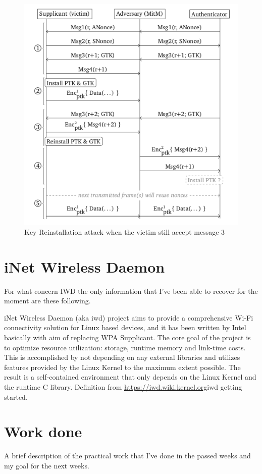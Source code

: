 \begin{figure}[tbh]
  \centering
  \includegraphics[width=0.8\linewidth]{images/mitm.png}
  \caption[Key Reinstallation attack]{Key Reinstallation attack when the victim still accept message 3}
  \label{fig:mitm}
\end{figure}




\section{iNet Wireless Daemon}
For what concern IWD the only information that I've been able to recover for the moment are these following.

iNet Wireless Daemon (aka iwd) project aims to provide a comprehensive Wi-Fi connectivity solution for Linux based devices, and
it has been written by Intel basically with aim of replacing WPA Supplicant.
The core goal of the project is to optimize resource utilization: storage, runtime memory and link-time costs. 
This is accomplished by not depending on any external libraries and utilizes features provided by the Linux Kernel to the maximum extent possible. 
The result is a self-contained environment that only depends on the Linux Kernel and the runtime C library.
Definition from \url{https://iwd.wiki.kernel.org}{iwd getting started}.


\section{Work done}
A brief description of the practical work that I've done in the passed weeks and my goal for the next weeks.

